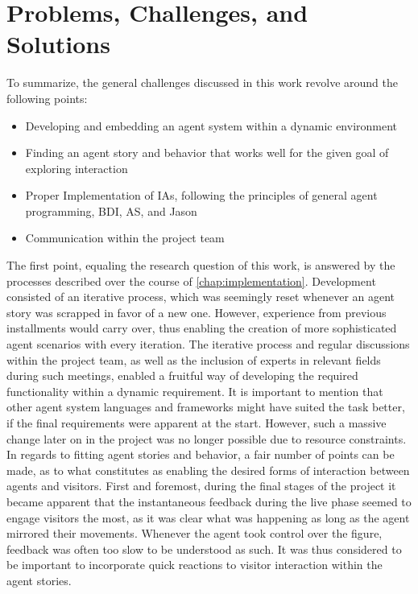 \documentclass[draft,final]{vutinfth} %
\begin{document}
\section{Problems, Challenges, and Solutions}
\label{problems}

To summarize, the general challenges discussed in this work revolve around the following points:
\begin{itemize}
	\item Developing and embedding an agent system within a dynamic environment
	\item Finding an agent story and behavior that works well for the given goal of exploring interaction 
	\item Proper Implementation of IAs, following the principles of general agent programming, BDI, AS, and Jason 
	\item Communication within the project team
\end{itemize}
The first point, equaling the research question of this work, is answered by the processes described over the course of \autoref{chap:implementation}. 
Development consisted of an iterative process, which was seemingly reset whenever an agent story was scrapped in favor of a new one. 
However, experience from previous installments would carry over, thus enabling the creation of more sophisticated agent scenarios with every iteration. 
The iterative process and regular discussions within the project team, as well as the inclusion of experts in relevant fields during such meetings, enabled a fruitful way of developing the required functionality within a dynamic requirement. 
It is important to mention that other agent system languages and frameworks might have suited the task better, if the final requirements were apparent at the start. 
However, such a massive change later on in the project was no longer possible due to resource constraints.\\
In regards to fitting agent stories and behavior, a fair number of points can be made, as to what constitutes as enabling the desired forms of interaction between agents and visitors. 
First and foremost, during the final stages of the project it became apparent that the instantaneous feedback during the live phase seemed to engage visitors the most, as it was clear what was happening as long as the agent mirrored their movements. 
Whenever the agent took control over the figure, feedback was often too slow to be understood as such. 
It was thus considered to be important to incorporate quick reactions to visitor interaction within the agent stories. 
\end{document}
